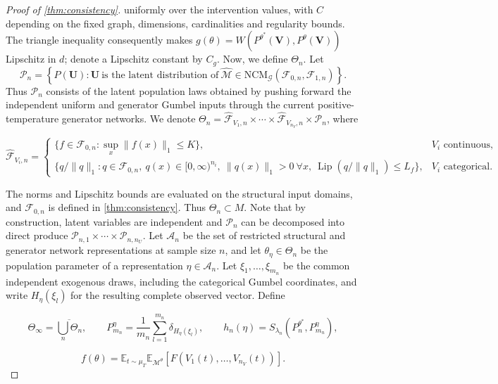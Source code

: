 \begin{proof}[Proof of \cref{thm:consistency}]
uniformly over the intervention values, with $C$ depending on the fixed graph, dimensions, cardinalities and regularity bounds. The triangle inequality consequently makes $g(\theta)=W(P^{\theta^*}(\boldsymbol V),P^\theta(\boldsymbol V))$ Lipschitz in $d$; denote a Lipschitz constant by $C_g$. Now, we define $ \Theta _{n}$. Let 
\begin{equation*}
\mathcal{P}_{n} =\left\{{P}({\boldsymbol{U}}):\boldsymbol{U} \ \text{is the latent distribution of} \  \hat{\mathcal{M}} \in \text{NCM}_{\mathcal{G}} (\mathcal{F}_{0,n} ,\mathcal{F}_{1,n})\right\}.
\end{equation*}
Thus $\mathcal P_n$ consists of the latent population laws obtained by pushing forward the independent uniform and generator Gumbel inputs through the current positive-temperature generator networks. We denote $\Theta_n=\hat{\mathcal F}_{V_1,n}\times\cdots\times\hat{\mathcal F}_{V_{n_V},n}\times\mathcal P_n$, where

\[
\hat{\mathcal F}_{V_i,n}=\begin{cases}
\{f\in\mathcal F_{0,n}:\sup_x\|f(x)\|_1\leqslant K\},&V_i\text{ continuous},\\
\{q/\|q\|_1:q\in\mathcal F_{0,n},\ q(x)\in[0,\infty)^{n_i},\ \|q(x)\|_1>0\ \forall x,\ \operatorname{Lip}(q/\|q\|_1)\leqslant\hat L_f\},&V_i\text{ categorical}.
\end{cases}
\]

The norms and Lipschitz bounds are evaluated on the structural input domains, and $\mathcal F_{0,n}$ is defined in \cref{thm:consistency}. Thus $\Theta_n\subset M$. Note that by construction, latent variables are independent and $ \mathcal{P}_{n}$ can be decomposed into direct produce $ \mathcal{P}_{n,1} \times \cdots \times \mathcal{P}_{n,n_{U}}$. Let $\mathcal A_n$ be the set of restricted structural and generator network representations at sample size $n$, and let $\theta_\eta\in\Theta_n$ be the population parameter of a representation $\eta\in\mathcal A_n$. Let $\xi_1,\ldots,\xi_{m_n}$ be the common independent exogenous draws, including the categorical Gumbel coordinates, and write $H_\eta(\xi_l)$ for the resulting complete observed vector. Define

\[
\Theta_\infty=\overline{\bigcup_n\Theta_n},\qquad P_{m_n}^\eta=\frac1{m_n}\sum_{l=1}^{m_n}\delta_{H_\eta(\xi_l)},\qquad h_n(\eta)=S_{\lambda_n}(P_n^{\theta^*},P_{m_n}^\eta),
\]

\[
f(\theta)=\mathbb E_{t\sim\mu_T}\mathbb E_{\mathcal M^\theta}[F(V_1(t),\ldots,V_{n_V}(t))].
\]


\end{proof}
